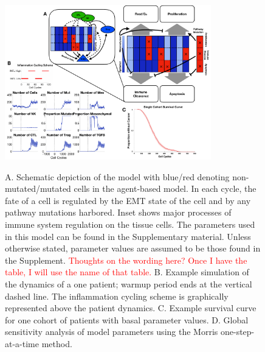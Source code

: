 \documentclass[11pt]{article}
\newcommand{\tcr} { \textcolor{red} }
\begin{document}
\begin{figure}
\center
{\includegraphics[width=0.8\textwidth]{Figure1/Figure1.pdf}}
\caption{A. Schematic depiction of the model with blue/red denoting non-mutated/mutated cells in the agent-based model. In each cycle, the fate of a cell is regulated by the EMT state of the cell and by any pathway mutations harbored. Inset shows major processes of immune system regulation on the tissue cells. The parameters used in this model can be found in the Supplementary material. Unless otherwise stated, parameter values are assumed to be those found in the Supplement. \tcr{Thoughts on the wording here? Once I have the table, I will use the name of that table.}
B. Example simulation of the dynamics of a one patient; warmup period ends at the vertical dashed line.
The inflammation cycling scheme is graphically represented above the patient dynamics.
C. Example survival curve for one cohort of patients with basal parameter values.
D. Global sensitivity analysis of model parameters using the Morris one-step-at-a-time method.}
\label{fig:ModelIntro}
\end{figure}
\end{document}
